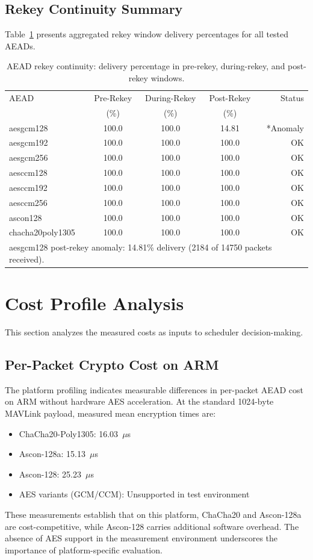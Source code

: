 \documentclass[conference]{IEEEtran}
\begin{document}
\subsection{Rekey Continuity Summary}
Table~\ref{tab:rekey-summary} presents aggregated rekey window delivery percentages for all tested AEADs.
\begin{table}[htbp]
\centering
\caption{AEAD rekey continuity: delivery percentage in pre-rekey, during-rekey, and post-rekey windows.}
\label{tab:rekey-summary}
\begin{tabular}{l|ccc|r}
\toprule
AEAD & Pre-Rekey & During-Rekey & Post-Rekey & Status \\
 & (\%) & (\%) & (\%) & \\
\midrule
aesgcm128 & 100.0 & 100.0 & 14.81 & *Anomaly \\
aesgcm192 & 100.0 & 100.0 & 100.0 & OK \\
aesgcm256 & 100.0 & 100.0 & 100.0 & OK \\
aesccm128 & 100.0 & 100.0 & 100.0 & OK \\
aesccm192 & 100.0 & 100.0 & 100.0 & OK \\
aesccm256 & 100.0 & 100.0 & 100.0 & OK \\
ascon128 & 100.0 & 100.0 & 100.0 & OK \\
chacha20poly1305 & 100.0 & 100.0 & 100.0 & OK \\
\bottomrule
\multicolumn{5}{l}{\small *aesgcm128 post-rekey anomaly: 14.81\% delivery (2184 of 14750 packets received).}
\end{tabular}
\end{table}
\section{Cost Profile Analysis}
This section analyzes the measured costs as inputs to scheduler decision-making.
\subsection{Per-Packet Crypto Cost on ARM}
The platform profiling indicates measurable differences in per-packet AEAD cost on ARM without hardware AES acceleration. At the standard 1024-byte MAVLink payload, measured mean encryption times are:
\begin{itemize}[leftmargin=*]
\item ChaCha20-Poly1305: 16.03 \,$\mu$s
\item Ascon-128a: 15.13 \,$\mu$s
\item Ascon-128: 25.23 \,$\mu$s
\item AES variants (GCM/CCM): Unsupported in test environment
\end{itemize}
These measurements establish that on this platform, ChaCha20 and Ascon-128a are cost-competitive, while Ascon-128 carries additional software overhead. The absence of AES support in the measurement environment underscores the importance of platform-specific evaluation.
\end{document}
